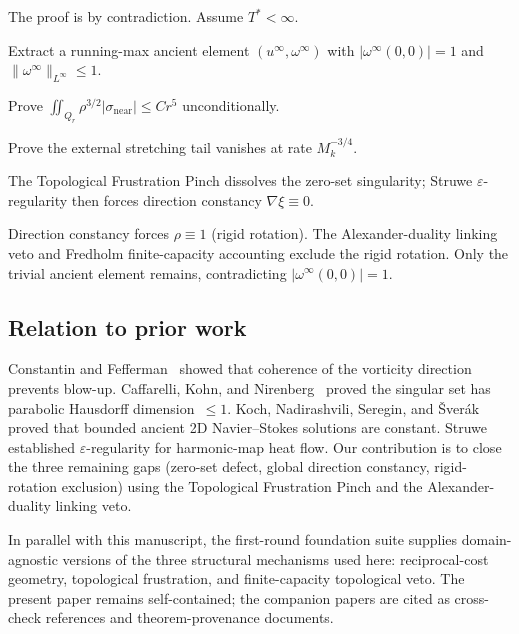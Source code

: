 \documentclass[12pt, reqno]{amsart}
\theoremstyle{definition}
\theoremstyle{remark}
\numberwithin{equation}{section}
\newcommand{\eps}{\varepsilon}
\begin{document}
The proof is by contradiction.  Assume $T^*<\infty$.

\begin{description}[style=unboxed,leftmargin=0pt,itemsep=4pt,
  font=\normalfont\bfseries]
\item[Stage 1 (Section~\ref{sec:ancient}).]
Extract a running-max ancient element $(u^\infty,\omega^\infty)$
with $|\omega^\infty(0,0)|=1$ and $\|\omega^\infty\|_{L^\infty}\le 1$.
\item[Stage 2 (Section~\ref{sec:nearfield}).]
Prove $\iint_{Q_r}\rho^{3/2}|\sigma_{\mathrm{near}}|\le Cr^5$
unconditionally.
\item[Stage 3 (Section~\ref{sec:tail}).]
Prove the external stretching tail vanishes at rate $M_k^{-3/4}$.
\item[Stage 4 (Sections~\ref{sec:frustration}--\ref{sec:direction}).]
The Topological Frustration Pinch dissolves the zero-set singularity;
Struwe $\eps$-regularity then forces direction constancy
$\nabla\xi\equiv 0$.
\item[Stage 5 (Sections~\ref{sec:collapse}--\ref{sec:veto}).]
Direction constancy forces $\rho\equiv 1$ (rigid rotation).
The Alexander-duality linking veto and Fredholm finite-capacity
accounting exclude the rigid rotation.  Only the trivial ancient
element remains, contradicting $|\omega^\infty(0,0)|=1$.
\end{description}

\subsection{Relation to prior work}

Constantin and Fefferman~\cite{CF1993} showed that coherence of
the vorticity direction prevents blow-up.
Caffarelli, Kohn, and Nirenberg~\cite{CKN1982} proved the singular
set has parabolic Hausdorff dimension~$\le 1$.
Koch, Nadirashvili, Seregin, and \v{S}ver\'ak~\cite{KNSS2009}
proved that bounded ancient 2D Navier--Stokes solutions are constant.
Struwe~\cite{Struwe1988} established $\eps$-regularity for harmonic-map
heat flow.
Our contribution is to close the three remaining gaps (zero-set defect,
global direction constancy, rigid-rotation exclusion) using the
Topological Frustration Pinch and the Alexander-duality linking veto.

In parallel with this manuscript, the first-round foundation suite
\cite{FSPlan,F1JCost,F2Frustration,F6Veto} supplies domain-agnostic
versions of the three structural mechanisms used here: reciprocal-cost
geometry, topological frustration, and finite-capacity topological veto.
The present paper remains self-contained; the companion papers are cited
as cross-check references and theorem-provenance documents.
\end{document}
